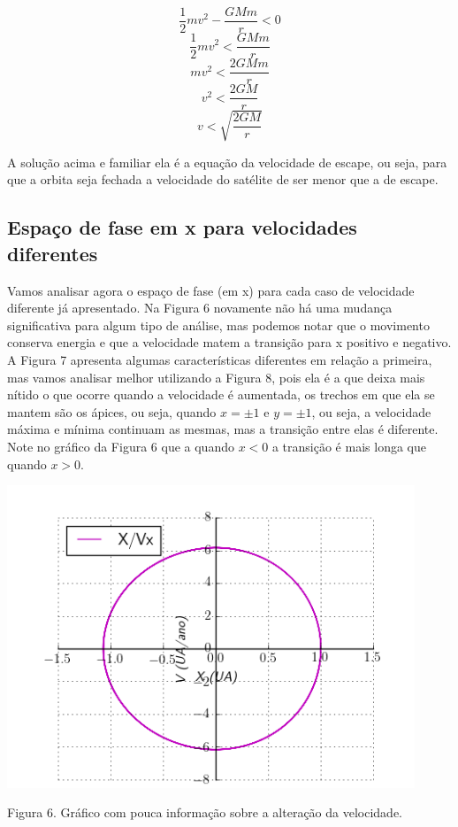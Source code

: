 \documentclass[a4paper]{article} %
\begin{document}
\[\frac{1}{2}mv^2 - \frac{GMm}{r} < 0\]
\[\frac{1}{2}mv^2 < \frac{GMm}{r}\]
\[mv^2 < \frac{2GMm}{r}\]
\[v^2 < \frac{2GM}{r}\]
\begin{equation}
	v < \sqrt{\frac{2GM}{r}}
\end{equation}

A solução acima e familiar ela é a equação da velocidade de escape, ou seja, para que a orbita seja fechada a velocidade do satélite de ser menor que a de escape.

\subsection{Espaço de fase em x para velocidades diferentes}
\noindent

Vamos analisar agora o espaço de fase (em x) para cada caso de velocidade diferente já apresentado. Na Figura 6 novamente não há uma mudança significativa para algum tipo de análise, mas podemos notar que o movimento conserva energia e que a velocidade matem a transição para x positivo e negativo. A Figura 7 apresenta algumas características diferentes em relação a primeira, mas vamos analisar melhor utilizando a Figura 8, pois ela é a que deixa mais nítido o que ocorre quando a velocidade é aumentada, os trechos em que ela se mantem são os ápices, ou seja, quando $x = \pm1$ e $y = \pm1$, ou seja, a velocidade máxima e mínima continuam as mesmas, mas a transição entre elas é diferente. Note no gráfico da Figura 6 que a quando $x < 0$ a transição é mais longa que quando $x > 0$.
\begin{center}
	\includegraphics[width=4.80in,height=3.56in, keepaspectratio=false]{image2_15-51-19-589000.png}
	
	\scriptsize {Figura 6. Gráfico com pouca informação sobre a alteração da velocidade.}
\end{center}
\end{document}

